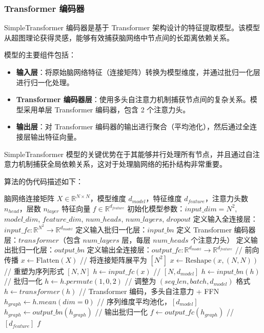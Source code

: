 \documentclass[12pt,a4paper]{article}
\begin{document}
\subsubsection{Transformer 编码器}

SimpleTransformer 编码器是基于 Transformer 架构设计的特征提取模型。该模型从超图理论获得灵感\cite{feng2019hypergraph}，能够有效捕获脑网络中节点间的长距离依赖关系。

模型的主要组件包括：
\begin{itemize}
\item \textbf{输入层}：将原始脑网络特征（连接矩阵）转换为模型维度，并通过批归一化层进行归一化处理。
\item \textbf{Transformer 编码器层}：使用多头自注意力机制捕获节点间的复杂关系。模型采用单层 Transformer 编码器，包含 2 个注意力头。
\item \textbf{输出层}：对 Transformer 编码器的输出进行聚合（平均池化），然后通过全连接层输出特征向量。
\end{itemize}

SimpleTransformer 模型的关键优势在于其能够并行处理所有节点，并且通过自注意力机制捕获全局依赖关系，这对于处理脑网络的拓扑结构非常重要。

算法的伪代码描述如下：

\begin{algorithm}[H]
\caption{SimpleTransformerModel}
\begin{algorithmic}[1]
\REQUIRE 脑网络连接矩阵 $X \in \mathbb{R}^{N \times N}$，模型维度 $d_{model}$，特征维度 $d_{feature}$，注意力头数 $n_{head}$，层数 $n_{layer}$
\ENSURE 特征向量 $f \in \mathbb{R}^{d_{feature}}$
\STATE 初始化模型参数：$input\_dim = N^2$, $model\_dim$, $feature\_dim$, $num\_heads$, $num\_layers$, $dropout$
\STATE 定义输入全连接层：$input\_fc: \mathbb{R}^{N^2} \rightarrow \mathbb{R}^{d_{model}}$
\STATE 定义输入批归一化层：$input\_bn$
\STATE 定义 Transformer 编码器层：$transformer$（包含 $num\_layers$ 层，每层 $num\_heads$ 个注意力头）
\STATE 定义输出批归一化层：$output\_bn$
\STATE 定义输出全连接层：$output\_fc: \mathbb{R}^{d_{model}} \rightarrow \mathbb{R}^{d_{feature}}$
\STATE // 前向传播
\STATE $x \leftarrow \text{Flatten}(X)$ \quad // 将连接矩阵展平为 $[N^2]$
\STATE $x \leftarrow \text{Reshape}(x, (N, N))$ \quad // 重塑为序列形式 $[N, N]$
\STATE $h \leftarrow input\_fc(x)$ \quad // $[N, d_{model}]$
\STATE $h \leftarrow input\_bn(h)$ \quad // 批归一化
\STATE $h \leftarrow h.permute(1, 0, 2)$ \quad // 调整为 $(seq\_len, batch, d_{model})$ 格式
\STATE $h \leftarrow transformer(h)$ \quad // Transformer 编码，多头自注意力 + FFN
\STATE $h_{graph} \leftarrow h.mean(dim=0)$ \quad // 序列维度平均池化，$[d_{model}]$
\STATE $h_{graph} \leftarrow output\_bn(h_{graph})$ \quad // 输出批归一化
\STATE $f \leftarrow output\_fc(h_{graph})$ \quad // $[d_{feature}]$
\RETURN $f$
\end{algorithmic}
\end{algorithm}
\end{document}
